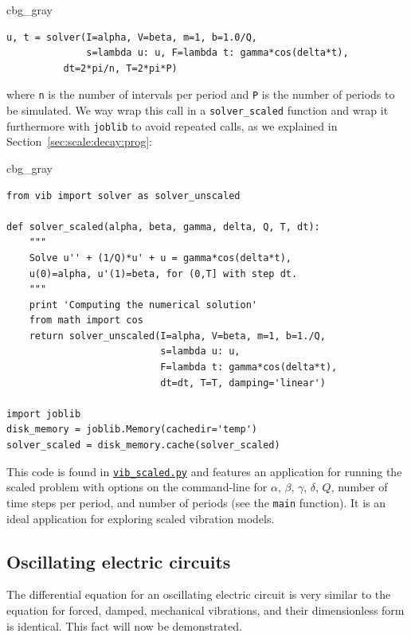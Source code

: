 \documentclass[graybox,envcountchap,sectrefs,final]{svmonodo}
\newenvironment{_cod_tight}[1]{
   \def\FrameCommand{\colorbox{#1}}
   \FrameRule0.6pt\MakeFramed {\FrameRestore}\vskip3mm}
   {\vskip0mm\endMakeFramed}
\newenvironment{cod}[1]{
\bgroup\rmfamily
\fboxsep=0mm\relax
\begin{_cod_tight}{#1}
\list{}{\parsep=-2mm\parskip=0mm\topsep=0pt\leftmargin=2mm
\rightmargin=2\leftmargin\leftmargin=4pt\relax}
\item\relax}
{\endlist\end{_cod_tight}\egroup}
\begin{document}
\begin{cod}{cbg_gray}\begin{Verbatim}[numbers=none,fontsize=\fontsize{9pt}{9pt},baselinestretch=0.95,xleftmargin=2mm]
u, t = solver(I=alpha, V=beta, m=1, b=1.0/Q,
              s=lambda u: u, F=lambda t: gamma*cos(delta*t),
	      dt=2*pi/n, T=2*pi*P)
\end{Verbatim}
\end{cod}
\noindent
where \texttt{n} is the number of intervals per period and \texttt{P} is the number
of periods to be simulated.
We way wrap this call in a \Verb!solver_scaled! function and wrap it furthermore
with \texttt{joblib} to avoid repeated calls,
as we explained in
Section~\ref{sec:scale:decay:prog}:

\begin{cod}{cbg_gray}\begin{Verbatim}[numbers=none,fontsize=\fontsize{9pt}{9pt},baselinestretch=0.95,xleftmargin=2mm]
from vib import solver as solver_unscaled

def solver_scaled(alpha, beta, gamma, delta, Q, T, dt):
    """
    Solve u'' + (1/Q)*u' + u = gamma*cos(delta*t),
    u(0)=alpha, u'(1)=beta, for (0,T] with step dt.
    """
    print 'Computing the numerical solution'
    from math import cos
    return solver_unscaled(I=alpha, V=beta, m=1, b=1./Q,
                           s=lambda u: u,
                           F=lambda t: gamma*cos(delta*t),
                           dt=dt, T=T, damping='linear')

import joblib
disk_memory = joblib.Memory(cachedir='temp')
solver_scaled = disk_memory.cache(solver_scaled)
\end{Verbatim}
\end{cod}
\noindent
This code is found in \href{{http://tinyurl.com/o8pb3yy/vib_scaled.py}}{\nolinkurl{vib_scaled.py}}
and features an application for running the scaled problem with
options on the command-line for $\alpha$, $\beta$, $\gamma$, $\delta$,
$Q$, number of time steps per period, and number of periods (see
the \texttt{main} function). It is an ideal application for exploring
scaled vibration models.


\subsection{Oscillating electric circuits}

The differential equation for an oscillating electric circuit is
very similar to the equation for forced, damped,
mechanical vibrations, and their
dimensionless form is identical. This fact will now be demonstrated.
\end{document}
